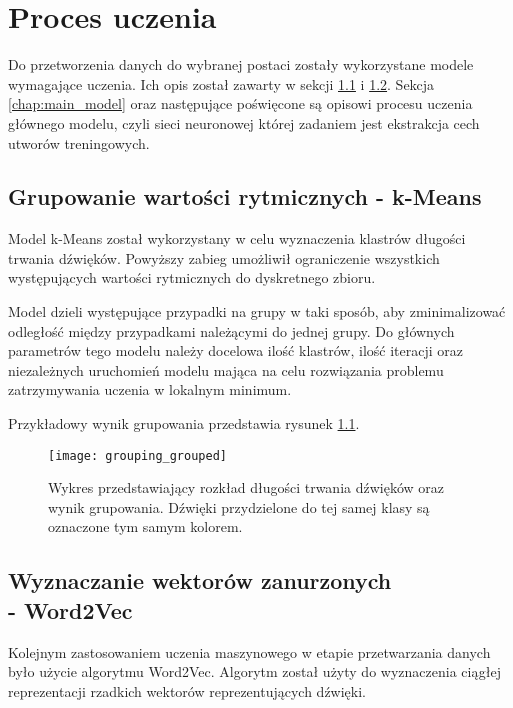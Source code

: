 \chapter{Proces uczenia} 
{
    Do przetworzenia danych do wybranej postaci zostały wykorzystane modele wymagające uczenia.
    Ich opis został zawarty w sekcji \ref{chap:models_data_k} i\,\,\ref{chap:models_data_v}. Sekcja \ref{chap:main_model} oraz następujące
    poświęcone są opisowi procesu uczenia głównego modelu, czyli sieci neuronowej której 
    zadaniem jest ekstrakcja cech utworów treningowych.

    \section{Grupowanie wartości rytmicznych - k-Means}\label{chap:models_data_k}
    {
        Model k-Means został wykorzystany w\,\,celu wyznaczenia klastrów
        długości trwania dźwięków. Powyższy zabieg umożliwił ograniczenie wszystkich występujących 
        wartości rytmicznych do dyskretnego zbioru. 
        
        Model dzieli występujące przypadki na grupy w taki sposób, aby zminimalizować odległość 
        między przypadkami należącymi do jednej grupy.
        Do głównych parametrów tego modelu należy docelowa ilość klastrów, ilość iteracji
        oraz niezależnych uruchomień modelu mająca na celu rozwiązania problemu zatrzymywania uczenia w\,\,lokalnym minimum.

        Przykładowy wynik grupowania przedstawia rysunek \ref{grouping}.

        \begin{figure}[H]
            \centering
            \texttt{[image: grouping\_grouped]}
            \caption{Wykres przedstawiający rozkład długości trwania dźwięków oraz wynik grupowania. Dźwięki przydzielone do tej samej klasy są oznaczone tym samym kolorem.}
            \label{grouping}
        \end{figure}
    }

    \section{Wyznaczanie wektorów zanurzonych \\ - Word2Vec}\label{chap:models_data_v}
    {
        Kolejnym zastosowaniem uczenia maszynowego w\,\,etapie przetwarzania danych było użycie algorytmu Word2Vec. Algorytm 
        został użyty do wyznaczenia ciągłej reprezentacji rzadkich wektorów reprezentujących dźwięki.
        
}}
